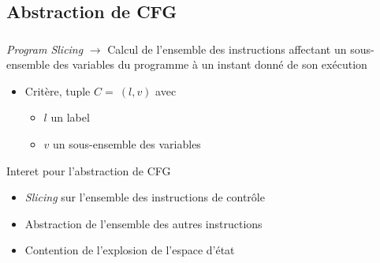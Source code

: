 \documentclass{beamer}
\begin{document}
  \subsection{Abstraction de CFG}
  \begin{frame}
    \frametitle{\secname}
    \framesubtitle{\subsecname}

    \begin{block}{\textit{Program Slicing}}
      $\rightarrow$ Calcul de l'ensemble des instructions affectant un
      sous-ensemble des variables du programme à un instant donné de son
      exécution
      \begin{itemize}
        \item Critère, tuple $C =~(l, v)$ avec
          \begin{itemize}
            \item $l$ un label
            \item $v$ un sous-ensemble des variables
          \end{itemize}
      \end{itemize}
    \end{block}

    \vfill
    \begin{block}{Interet pour l'abstraction de CFG}
      \begin{itemize}
        \item \emph{Slicing} sur l'ensemble des instructions de contrôle
        \item Abstraction de l'ensemble des autres instructions
        \item Contention de l'explosion de l'espace d'état
      \end{itemize}
    \end{block}
  \end{frame}
\end{document}
